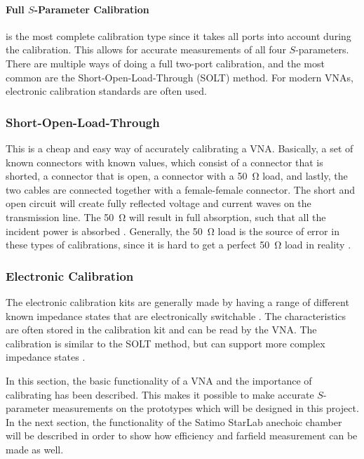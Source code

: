 \paragraph{Full $S$-Parameter Calibration} is the most complete calibration type since it takes all ports into account during the calibration. This allows for accurate measurements of all four $S$-parameters. There are multiple ways of doing a full two-port calibration, and the most common are the Short-Open-Load-Through (SOLT) method. For modern VNAs, electronic calibration standards are often used. 

\subsubsection{Short-Open-Load-Through}
This is a cheap and easy way of accurately calibrating a VNA. Basically, a set of known connectors with known values, which consist of a connector that is shorted, a connector that is open, a connector with a \SI{50}{\ohm} load, and lastly, the two cables are connected together with a female-female connector. The short and open circuit will create fully reflected voltage and current waves on the transmission line. The \SI{50}{\ohm} will result in full absorption, such that all the incident power is absorbed \cite{agilentAppNoteVNA}. Generally, the \SI{50}{\ohm} load is the source of error in these types of calibrations, since it is hard to get a perfect \SI{50}{\ohm} load in reality \cite{nationalInstruVNA}. 

\subsubsection{Electronic Calibration}
The electronic calibration kits are generally made by having a range of different known impedance states that are electronically switchable \cite{agilentEcal}. The characteristics are often stored in the calibration kit and can be read by the VNA. The calibration is similar to the SOLT method, but can support more complex impedance states \cite{agilentEcal}. 

\begin{aautail}
    In this section, the basic functionality of a VNA and the importance of calibrating has been described. This makes it possible to make accurate $S$-parameter measurements on the prototypes which will be designed in this project. In the next section, the functionality of the Satimo StarLab anechoic chamber will be described in order to show how efficiency and farfield measurement can be made as well.
\end{aautail}



